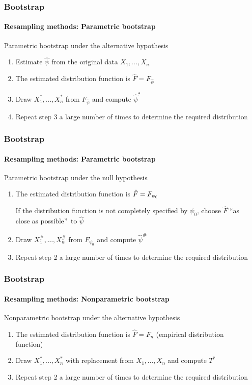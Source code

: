 \documentclass[smaller,compress]{beamer}
\begin{document}
\begin{frame}\frametitle{Bootstrap}\framesubtitle{Resampling methods: Parametric bootstrap}
Parametric bootstrap under the alternative hypothesis
\begin{enumerate}
    \item Estimate $\hat{\psi}$ from the original data $X_{1},\ldots ,X_{n}$
    \item The estimated distribution function is $\hat{F}=F_{\hat{\psi}}$
    \item Draw $X_{1}^{\ast },\dots ,X_{n}^{\ast }$ from $F_{\hat{\psi}}$ and compute $\hat{\psi}^{\ast }$
    \item Repeat step 3 a large number of times to determine the required distribution
\end{enumerate}
\end{frame}


\begin{frame}\frametitle{Bootstrap}\framesubtitle{Resampling methods: Parametric bootstrap}
Parametric bootstrap under the null hypothesis
\begin{enumerate}
    \item The estimated distribution function is $\hat{F}=F_{\psi_{0}}\medskip $

    If the distribution function is not completely specified by $\psi_{0}$, choose $\hat{F}$ \textquotedblleft as close as possible\textquotedblright\ to $\hat{\psi}$
    \item Draw $X_{1}^{\#},\dots ,X_{n}^{\#}$ from $F_{\psi_{0}}$ and compute $\hat{\psi}^{\#}$
    \item Repeat step 2 a large number of times to determine the required distribution
\end{enumerate}
\end{frame}


\begin{frame}\frametitle{Bootstrap}\framesubtitle{Resampling methods: Nonparametric bootstrap}
Nonparametric bootstrap under the alternative hypothesis
\begin{enumerate}
    \item The estimated distribution function is $\hat{F}=F_{n}$ (empirical distribution function)
    \item Draw $X_{1}^{\ast },\dots ,X_{n}^{\ast }$ with replacement from $X_{1},\ldots ,X_{n}$ and compute $T^{\ast }$
    \item Repeat step 2 a large number of times to determine the required distribution
\end{enumerate}
\end{frame}
\end{document}
